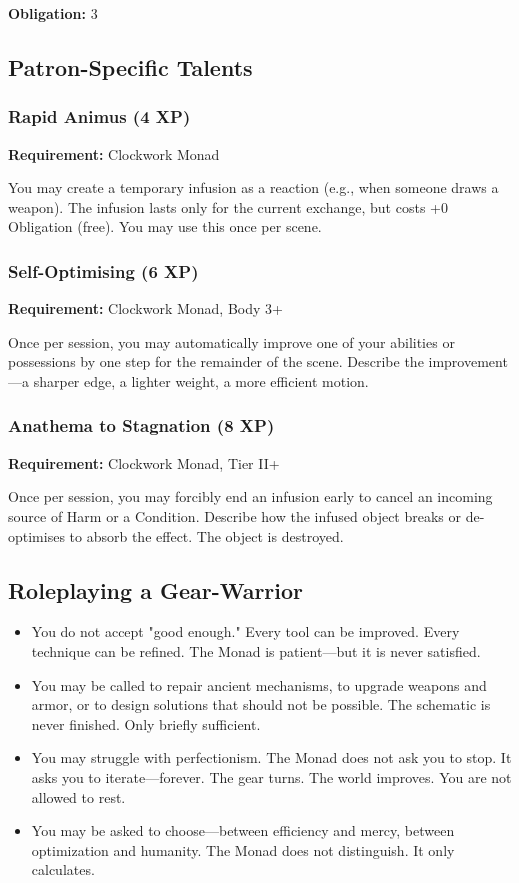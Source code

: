 \textbf{Obligation:} 3

\subsection{Patron-Specific Talents}

\subsubsection{Rapid Animus (4 XP)}

\textbf{Requirement:} Clockwork Monad

You may create a temporary infusion as a reaction (e.g., when someone draws a weapon). The infusion lasts only for the current exchange, but costs +0 Obligation (free). You may use this once per scene.

\subsubsection{Self-Optimising (6 XP)}

\textbf{Requirement:} Clockwork Monad, Body 3+

Once per session, you may automatically improve one of your abilities or possessions by one step for the remainder of the scene. Describe the improvement—a sharper edge, a lighter weight, a more efficient motion.

\subsubsection{Anathema to Stagnation (8 XP)}

\textbf{Requirement:} Clockwork Monad, Tier II+

Once per session, you may forcibly end an infusion early to cancel an incoming source of Harm or a Condition. Describe how the infused object breaks or de-optimises to absorb the effect. The object is destroyed.

\subsection{Roleplaying a Gear-Warrior}

\begin{itemize}
\item You do not accept "good enough." Every tool can be improved. Every technique can be refined. The Monad is patient—but it is never satisfied.
\item You may be called to repair ancient mechanisms, to upgrade weapons and armor, or to design solutions that should not be possible. The schematic is never finished. Only briefly sufficient.
\item You may struggle with perfectionism. The Monad does not ask you to stop. It asks you to iterate—forever. The gear turns. The world improves. You are not allowed to rest.
\item You may be asked to choose—between efficiency and mercy, between optimization and humanity. The Monad does not distinguish. It only calculates.
\end{itemize}

